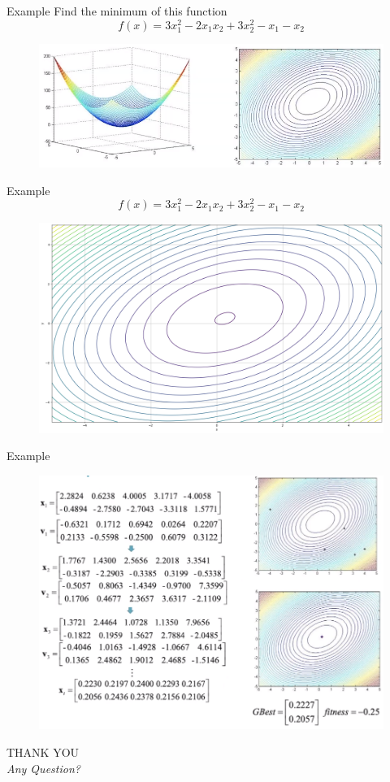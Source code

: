 \documentclass[pdflatex,compress,mathserif]{beamer}
\begin{document}
\begin{frame}{Example}
	Find the minimum of this function
	$$f(x) = 3x_1^2 - 2x_1x_2 + 3x_2^2 - x_1 - x_2$$
	\begin{figure}
		\centering
		\includegraphics[width=\linewidth]{img/15}
	\end{figure}
\end{frame}

\begin{frame}{Example}
	\scriptsize$$f(x) = 3x_1^2 - 2x_1x_2 + 3x_2^2 - x_1 - x_2$$
	\begin{figure}
		\centering
		\includegraphics[width=0.8\linewidth]{img/15a}
	\end{figure}
\end{frame}

\begin{frame}{Example}
	\begin{figure}
		\centering
		\includegraphics[width=\linewidth]{img/16}
	\end{figure}
\end{frame}

\begin{frame}
	\centering
	\LARGE{THANK YOU\\}
	\vspace{0.5cm}
	\large{\emph{Any Question?}}
\end{frame}
\end{document}
